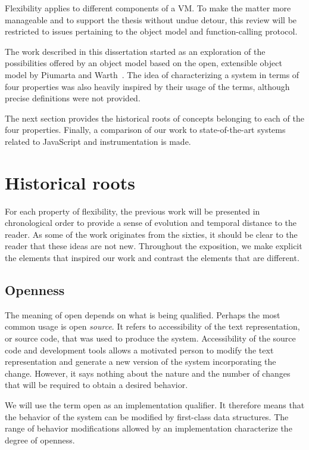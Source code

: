Flexibility applies to different components of a VM. To make the matter more
manageable and to support the thesis without undue detour, this review will be
restricted to issues pertaining to the object model and function-calling
protocol. 

The work described in this dissertation started as an exploration of the
possibilities offered by an object model based on the open, extensible object
model by Piumarta and Warth~\cite{Piumarta:2008}. The idea of characterizing a
system in terms of four properties was also heavily inspired by their usage of
the terms, although precise definitions were not provided.

The next section provides the historical roots of concepts belonging to each of
the four properties. Finally, a comparison of our work to state-of-the-art
systems related to JavaScript and instrumentation is made.

\section{Historical roots}

For each property of flexibility, the previous work will be presented in
chronological order to provide a sense of evolution and temporal distance to
the reader. As some of the work originates from the sixties, it should be clear
to the reader that these ideas are not new. Throughout the exposition, we make
explicit the elements that inspired our work and contrast the elements that are
different.

\subsection{Openness}

The meaning of open depends on what is being qualified. Perhaps the most common
usage is open \textit{source}. It refers to accessibility of the text
representation, or source code, that was used to produce the system.
Accessibility of the source code and development tools allows a motivated
person to modify the text representation and generate a new version of the
system incorporating the change. However, it says nothing about the nature and
the number of changes that will be required to obtain a desired behavior.

We will use the term open as an implementation qualifier. It therefore means that
the behavior of the system can be modified by first-class data structures. The
range of behavior modifications allowed by an implementation characterize the
degree of openness.

